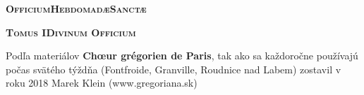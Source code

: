 
\def \feria {A}
\def \feriashort {b}
\def \ohschaptername {c}
\let\feriashort\relax
\let\feria\relax
{}
\begin{center}\huge{\textbf{\textsc{Officium\linebreak Hebdomadæ\linebreak Sanctæ}}}\end{center}

\begin{center}\large{\textbf{\textsc{Tomus I\linebreak Divinum Officium}}}\end{center}
\thispagestyle{empty}
\newpage{}

\clearpage
{}
\begin{center}
Podľa materiálov \textbf{Chœur grégorien de Paris}, 
\linebreak tak ako sa každoročne používajú počas svätého týždňa
\linebreak (Fontfroide, Granville, Roudnice nad Labem)
\linebreak zostavil v roku 2018 Marek Klein (www.gregoriana.sk)
\end{center}
\thispagestyle{empty}
\clearpage
\begin{comment}
\end{comment}


